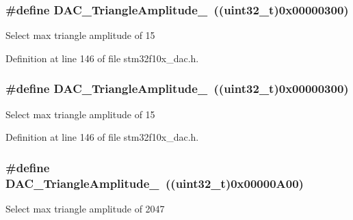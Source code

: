 \subsubsection[{\texorpdfstring{D\+A\+C\+\_\+\+Triangle\+Amplitude\+\_\+15}{DAC_TriangleAmplitude_15}}]{\setlength{\rightskip}{0pt plus 5cm}\#define D\+A\+C\+\_\+\+Triangle\+Amplitude\+\_~(({\bf uint32\+\_\+t})0x00000300)}\hypertarget{group___d_a_c__lfsrunmask__triangleamplitude_ga42653712ce783d33ecb2f3e97e9c2ece}{}\label{group___d_a_c__lfsrunmask__triangleamplitude_ga42653712ce783d33ecb2f3e97e9c2ece}
Select max triangle amplitude of 15 

Definition at line 146 of file stm32f10x\+\_\+dac.\+h.

\subsubsection[{\texorpdfstring{D\+A\+C\+\_\+\+Triangle\+Amplitude\+\_\+15}{DAC_TriangleAmplitude_15}}]{\setlength{\rightskip}{0pt plus 5cm}\#define D\+A\+C\+\_\+\+Triangle\+Amplitude\+\_~(({\bf uint32\+\_\+t})0x00000300)}\hypertarget{group___d_a_c__lfsrunmask__triangleamplitude_ga42653712ce783d33ecb2f3e97e9c2ece}{}\label{group___d_a_c__lfsrunmask__triangleamplitude_ga42653712ce783d33ecb2f3e97e9c2ece}
Select max triangle amplitude of 15 

Definition at line 146 of file stm32f10x\+\_\+dac.\+h.

\subsubsection[{\texorpdfstring{D\+A\+C\+\_\+\+Triangle\+Amplitude\+\_\+2047}{DAC_TriangleAmplitude_2047}}]{\setlength{\rightskip}{0pt plus 5cm}\#define D\+A\+C\+\_\+\+Triangle\+Amplitude\+\_~(({\bf uint32\+\_\+t})0x00000\+A00)}\hypertarget{group___d_a_c__lfsrunmask__triangleamplitude_gad33d28d7fcc09d84500ea9b6e6c5feed}{}\label{group___d_a_c__lfsrunmask__triangleamplitude_gad33d28d7fcc09d84500ea9b6e6c5feed}
Select max triangle amplitude of 2047 

